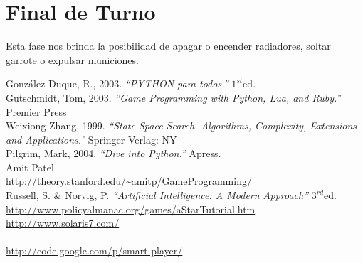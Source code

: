 \documentclass[a4paper,12pt,oneside]{book}
\renewcommand{\baselinestretch}{1.5}
\begin{document}
\section{Final de Turno}

Esta fase nos brinda la posibilidad de apagar o encender radiadores,
soltar garrote o expulsar municiones.

\newpage
\renewcommand{\baselinestretch}{1}
\normalsize
\begin{thebibliography}{XXX}
 González Duque, R., 2003. {\it ``PYTHON para todos.''} $1^{st}$ed. \\
 Gutschmidt, Tom, 2003. {\it ``Game Programming with Python,
    Lua, and Ruby.''  } Premier Press \\
 Weixiong Zhang, 1999. {\it ``State-Space Search. Algorithms,
    Complexity, Extensions and Applications.''} Springer-Verlag: NY \\
 Pilgrim, Mark, 2004. {\it ``Dive into Python.''} Apress. \\
 Amit Patel\\ \url{
    http://theory.stanford.edu/~amitp/GameProgramming/} \label{amit}
  \\
 Russell, S. \& Norvig, P. {\it ``Artificial Intelligence: A
    Modern Approach''} $3^{rd}$ed. \\ \label{russell}
  \url{http://www.policyalmanac.org/games/aStarTutorial.htm}\\
  \url{http://www.solaris7.com/ }\\
  \url{ }\\
  \url{http://code.google.com/p/smart-player/ } \label{googlecode}
\end{thebibliography}
\end{document}
